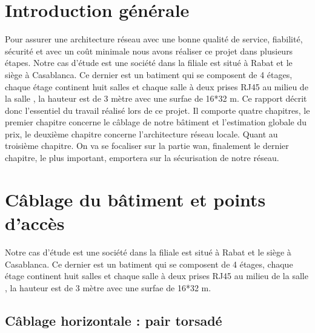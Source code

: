 \documentclass[12pt,a4paper]{report}
\begin{document}
	\printacronyms[include-classes=abbrev,name=Abbreviations]
	\listoffigures
	\tableofcontents

	\chapter*{Introduction générale}
	Pour assurer une architecture réseau avec une bonne qualité de service, fiabilité, sécurité et avec un coût minimale nous avons réaliser ce projet dans plusieurs étapes. 
	Notre cas d'étude est une société dans la filiale est situé à Rabat et le siège à Casablanca. Ce dernier est un batiment qui se composent de 4 étages, chaque étage continent huit salles et chaque salle à deux prises RJ45 \guillemotleft au milieu de la salle \guillemotright, la hauteur est de 3 mètre avec une surfae de 16*32 m.
	Ce rapport décrit donc l'essentiel du travail réalisé lors de ce projet. Il comporte quatre chapitres, le premier chapitre concerne le câblage de notre bâtiment et l'estimation globale du prix, le deuxième chapitre concerne l'architecture réseau locale. Quant au troisième chapitre. On va se focaliser sur la partie \ac{wan}, finalement le dernier chapitre, le plus important, emportera sur la sécurisation de notre réseau.

	

	
	





	

		\chapter{Câblage du bâtiment et points d'accès}
		

		
		Notre cas d'étude est une société dans la filiale est situé à Rabat et le siège à Casablanca. Ce dernier est un batiment qui se composent de 4 étages, chaque étage continent huit salles et chaque salle à deux prises RJ45 \guillemotleft au milieu de la salle \guillemotright, la hauteur est de 3 mètre avec une surfae de 16*32 m.

		\section{Câblage horizontale : pair torsadé}
		
\end{document}
